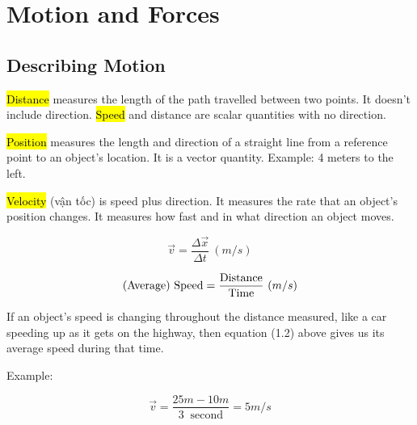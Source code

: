\chapter{Motion and Forces}

\section{Describing Motion}

\hl{Distance} measures the length of the path travelled between two points. It doesn't include direction. \hl{Speed} and distance are scalar quantities with no direction.

\hl{Position} measures the length and direction of a straight line from a reference point to an object's location. It is a vector quantity. Example: 4 meters to the left.

\hl{Velocity} (vận tốc) is speed plus direction. It measures the rate that an object's position changes. It measures how fast and in what direction an object moves.



\vspace{.5cm}

\begin{tcolorbox}[colback=red!5!white,colframe=red!75!black]
  \begin{equation}
  \vec{v}=\frac{\Delta\vec{x}}{\Delta t}\ (\unit{m/s})
  \end{equation}

  \begin{equation}
    \text{(Average) Speed}=\frac{\text{Distance}}{\text{Time}}\ \unit(m/s)
  \end{equation}
\end{tcolorbox}

If an object’s speed is changing throughout the distance measured, like a car speeding up as it gets on the highway, then equation (1.2) above gives us its average speed during that time.

Example:

\[\vec{v}=\frac{\si{25}{m}-\si{10}{m}}{3\ \text{ second}}=\si{5}{m/s}\]


